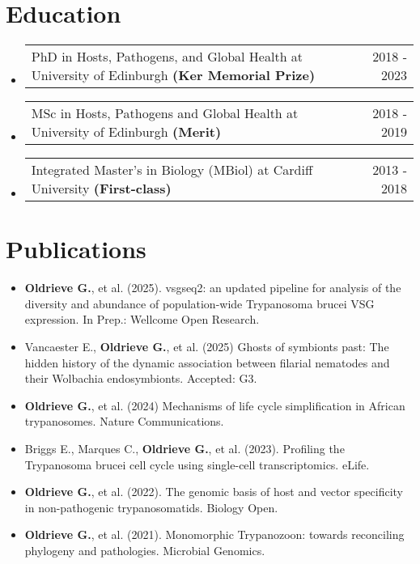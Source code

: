 \documentclass[a4paper,11pt]{article}
\begin{document}
\section{Education}
\begin{itemize}[leftmargin=1.2em, itemsep=3pt, label=-]
\item \begin{tabularx}{\linewidth}{@{}X r@{}}
PhD in Hosts, Pathogens, and Global Health at University of Edinburgh \textbf{(Ker Memorial Prize)} & 2018 - 2023 \\
\end{tabularx}
\item \begin{tabularx}{\linewidth}{@{}X r@{}}
MSc in Hosts, Pathogens and Global Health at University of Edinburgh \textbf{(Merit)} & 2018 - 2019 \\
\end{tabularx}
\item \begin{tabularx}{\linewidth}{@{}X r@{}}
Integrated Master's in Biology (MBiol) at Cardiff University \textbf{(First-class)} & 2013 - 2018 \\
\end{tabularx}
\end{itemize}

\section{Publications}
\begin{itemize}[leftmargin=1.2em, itemsep=3pt, label=-]
\item \textbf{Oldrieve G.}, et al. (2025). vsgseq2: an updated pipeline for analysis of the diversity and abundance of population-wide Trypanosoma brucei VSG expression. In Prep.: Wellcome Open Research.
\item Vancaester E., \textbf{Oldrieve G.}, et al. (2025) Ghosts of symbionts past: The hidden history of the dynamic association between filarial nematodes and their Wolbachia endosymbionts. Accepted: G3.
\item \textbf{Oldrieve G.}, et al. (2024) Mechanisms of life cycle simplification in African trypanosomes. Nature Communications.
\item Briggs E., Marques C., \textbf{Oldrieve G.}, et al. (2023). Profiling the Trypanosoma brucei cell cycle using single-cell transcriptomics. eLife.
\item \textbf{Oldrieve G.}, et al. (2022). The genomic basis of host and vector specificity in non-pathogenic trypanosomatids. Biology Open.
\item \textbf{Oldrieve G.}, et al. (2021). Monomorphic Trypanozoon: towards reconciling phylogeny and pathologies. Microbial Genomics.
\end{itemize}
\end{document}
